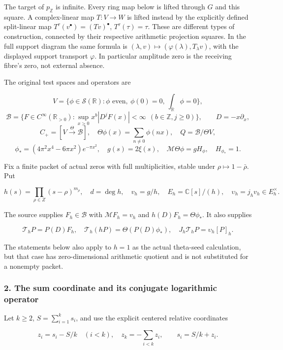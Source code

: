 The target of \(p_{\mathbb Z}\) is infinite. Every ring map below is
lifted through \(G\) and this square. A complex-linear map \(T:V\to W\)
is lifted instead by the explicitly defined split-linear map
\(T^\tau(v^\bullet)=(Tv)^\bullet\), \(T^\tau(\tau)=\tau\). These are
different types of construction, connected by their respective
arithmetic projection squares. In the full support diagram the same
formula is \((\lambda,v)\mapsto(\varphi(\lambda),T_\lambda v)\), with
the displayed support transport \(\varphi\). In particular amplitude
zero is the receiving fibre's zero, not external absence.

The original test spaces and operators are

\[V=\{\phi\in\mathcal S(\mathbb R):\phi\text{ even},\ \phi(0)=0,\ \int_{\mathbb R}\phi=0\},\]
\[\mathscr B=\{F\in C^\infty(\mathbb R_{>0}):\sup_{x>0}x^b|D^jF(x)|<\infty\ \ (b\in\mathbb Z,j\ge0)\},\qquad D=-x\partial_x,\]
\[C_+=[V\xrightarrow{\Theta}\mathscr B],\quad \Theta\phi(x)=\sum_{n\ne0}\phi(nx),\quad Q=\mathscr B/\Theta V,\]
\[\phi_*=(4\pi^2x^4-6\pi x^2)e^{-\pi x^2},\quad g(s)=2\xi(s),\quad \mathcal M\Theta\phi=gH_\phi,\quad H_{\phi_*}=1.\tag{1.3}\]

Fix a finite packet of actual zeros with full multiplicities, stable
under \(\rho\mapsto1-\bar\rho\). Put

\[h(s)=\prod_{\rho\in Z}(s-\rho)^{m_\rho},\quad d=\deg h,\quad v_h=g/h,\quad E_h=\mathbb C[s]/(h),\quad \upsilon_h=j_hv_h\in E_h^\times.\tag{1.4}\]

The source supplies \(F_h\in\mathscr B\) with \(\mathcal MF_h=v_h\) and
\(h(D)F_h=\Theta\phi_*\). It also supplies

\[\mathcal T_hP=P(D)F_h,\quad \mathcal T_h(hP)=\Theta(P(D)\phi_*),\quad J_h\mathcal T_hP=\upsilon_h[P]_h.\tag{1.5}\]

The statements below also apply to \(h=1\) as the actual theta-seed
calculation, but that case has zero-dimensional arithmetic quotient and
is not substituted for a nonempty packet.

\subsubsection{2. The sum coordinate and its conjugate logarithmic
operator}\label{sum_connection:the-sum-coordinate-and-its-conjugate-logarithmic-operator}

Let \(k\ge2\), \(S=\sum_{i=1}^ks_i\), and use the explicit centered
relative coordinates

\[z_i=s_i-S/k\quad(i<k),\quad z_k=-\sum_{i<k}z_i,\qquad s_i=S/k+z_i.\tag{2.1}\]

